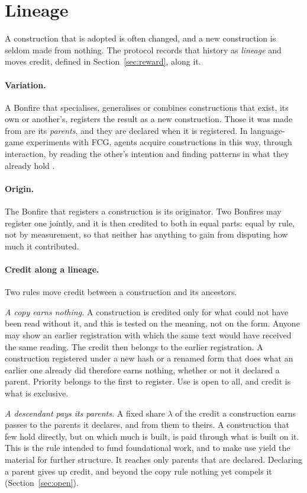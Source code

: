\section{Lineage}\label{sec:lineage}

A construction that is adopted is often changed, and a new construction is seldom made from nothing. The protocol
records that history as \emph{lineage} and moves credit, defined in Section~\ref{sec:reward}, along it.

\paragraph{Variation.} A Bonfire that specialises, generalises or combines constructions that exist, its own or
another's, registers the result as a new construction. Those it was made from are its \emph{parents}, and they are
declared when it is registered. In language-game experiments with FCG, agents acquire constructions in this way,
through interaction, by reading the other's intention and finding patterns in what they already hold
\citep{nevens2022language}.

\paragraph{Origin.} The Bonfire that registers a construction is its originator. Two Bonfires may register one
jointly, and it is then credited to both in equal parts: equal by rule, not by measurement, so that neither has
anything to gain from disputing how much it contributed.

\paragraph{Credit along a lineage.} Two rules move credit between a construction and its ancestors.

\emph{A copy earns nothing.} A construction is credited only for what could not have been read without it, and this
is tested on the meaning, not on the form. Anyone may show an earlier registration with which the same text would
have received the same reading. The credit then belongs to the earlier registration. A construction registered
under a new hash or a renamed form that does what an earlier one already did therefore earns nothing, whether or
not it declared a parent. Priority belongs to the first to register. Use is open to all, and credit is what is
exclusive.

\emph{A descendant pays its parents.} A fixed share $\lambda$ of the credit a construction earns passes to the
parents it declares, and from them to theirs. A construction that few hold directly, but on which much is built,
is paid through what is built on it. This is the rule intended to fund foundational work, and to make use yield
the material for further structure. It reaches only parents that are declared. Declaring a parent gives up credit,
and beyond the copy rule nothing yet compels it (Section~\ref{sec:open}).



